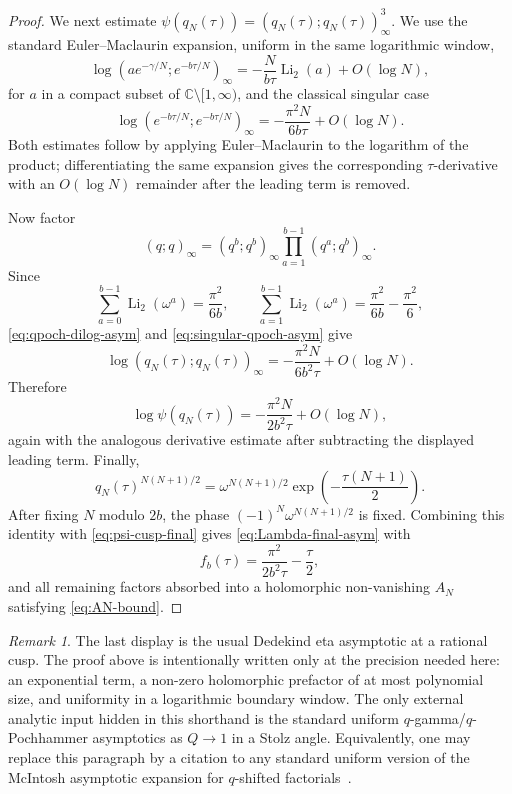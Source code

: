 \documentclass[11pt,a4paper,reqno]{amsart}
\theoremstyle{remark}
\newtheorem{remark}[theorem]{Remark}
\newcommand{\C}{\mathbb C}
\newcommand{\qpoch}[2]{(#1;#2)_\infty}
\begin{document}
\begin{proof}
We next estimate $\psi(q_N(\tau))=\qpoch{q_N(\tau)}{q_N(\tau)}^3$.  We use the standard Euler--Maclaurin expansion, uniform in the same logarithmic window,
\begin{equation}\label{eq:qpoch-dilog-asym}
        \log\qpoch{a e^{-\gamma/N}}{e^{-b\tau/N}}
        =-\frac{N}{b\tau}\operatorname{Li}_2(a)+O(\log N),
\end{equation}
for $a$ in a compact subset of $\C\setminus[1,\infty)$, and the classical singular case
\begin{equation}\label{eq:singular-qpoch-asym}
        \log\qpoch{e^{-b\tau/N}}{e^{-b\tau/N}}
        =-\frac{\pi^2N}{6b\tau}+O(\log N).
\end{equation}
Both estimates follow by applying Euler--Maclaurin to the logarithm of the product; differentiating the same expansion gives the corresponding $\tau$-derivative with an $O(\log N)$ remainder after the leading term is removed.

Now factor
\[
        \qpoch{q}{q}=\qpoch{q^b}{q^b}
        \prod_{a=1}^{b-1}\qpoch{q^a}{q^b}.
\]
Since
\[
        \sum_{a=0}^{b-1}\operatorname{Li}_2(\omega^a)=\frac{\pi^2}{6b},
        \qquad
        \sum_{a=1}^{b-1}\operatorname{Li}_2(\omega^a)=\frac{\pi^2}{6b}-\frac{\pi^2}{6},
\]
\eqref{eq:qpoch-dilog-asym} and \eqref{eq:singular-qpoch-asym} give
\[
        \log\qpoch{q_N(\tau)}{q_N(\tau)}
        =-\frac{\pi^2N}{6b^2\tau}+O(\log N).
\]
Therefore
\begin{equation}\label{eq:psi-cusp-final}
        \log\psi(q_N(\tau))
        =-\frac{\pi^2N}{2b^2\tau}+O(\log N),
\end{equation}
again with the analogous derivative estimate after subtracting the displayed leading term.
Finally,
\[
        q_N(\tau)^{N(N+1)/2}
        =\omega^{N(N+1)/2}\exp\left(-\frac{\tau(N+1)}2\right).
\]
After fixing $N$ modulo $2b$, the phase $(-1)^N\omega^{N(N+1)/2}$ is fixed.  Combining this identity with \eqref{eq:psi-cusp-final} gives \eqref{eq:Lambda-final-asym} with
\[
        f_b(\tau)=\frac{\pi^2}{2b^2\tau}-\frac{\tau}{2},
\]
and all remaining factors absorbed into a holomorphic non-vanishing $A_N$ satisfying \eqref{eq:AN-bound}.
\end{proof}
\begin{remark}
The last display is the usual Dedekind eta asymptotic at a rational cusp.  The proof above is intentionally written only at the precision needed here: an exponential term, a non-zero holomorphic prefactor of at most polynomial size, and uniformity in a logarithmic boundary window.  The only external analytic input hidden in this shorthand is the standard uniform $q$-gamma/$q$-Pochhammer asymptotics as $Q\to1$ in a Stolz angle.  Equivalently, one may replace this paragraph by a citation to any standard uniform version of the McIntosh asymptotic expansion for $q$-shifted factorials~\cite{McIntoshQShifted}.
\end{remark}
\end{document}
